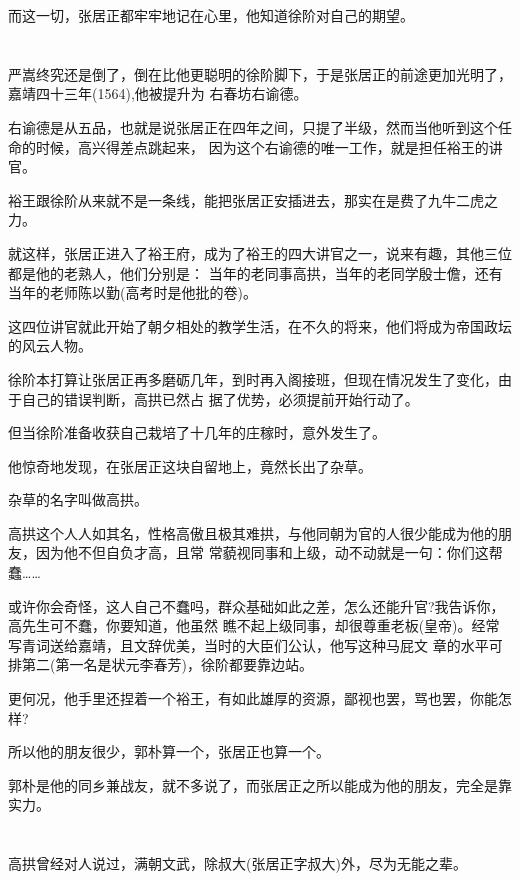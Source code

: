 \documentclass[11pt,a4paper,onecolumn]{article}
\begin{document}
而这一切，张居正都牢牢地记在心里，他知道徐阶对自己的期望。

\section[\thesection]{}

严嵩终究还是倒了，倒在比他更聪明的徐阶脚下，于是张居正的前途更加光明了，嘉靖四十三年(1564),他被提升为
右春坊右谕德。

右谕德是从五品，也就是说张居正在四年之间，只提了半级，然而当他听到这个任命的时候，高兴得差点跳起来，
因为这个右谕德的唯一工作，就是担任裕王的讲官。

裕王跟徐阶从来就不是一条线，能把张居正安插进去，那实在是费了九牛二虎之力。

就这样，张居正进入了裕王府，成为了裕王的四大讲官之一，说来有趣，其他三位都是他的老熟人，他们分别是：
当年的老同事高拱，当年的老同学殷士儋，还有当年的老师陈以勤(高考时是他批的卷)。

这四位讲官就此开始了朝夕相处的教学生活，在不久的将来，他们将成为帝国政坛的风云人物。

徐阶本打算让张居正再多磨砺几年，到时再入阁接班，但现在情况发生了变化，由于自己的错误判断，高拱已然占
据了优势，必须提前开始行动了。

但当徐阶准备收获自己栽培了十几年的庄稼时，意外发生了。

他惊奇地发现，在张居正这块自留地上，竟然长出了杂草。

杂草的名字叫做高拱。

高拱这个人人如其名，性格高傲且极其难拱，与他同朝为官的人很少能成为他的朋友，因为他不但自负才高，且常
常藐视同事和上级，动不动就是一句：你们这帮蠢……

或许你会奇怪，这人自己不蠢吗，群众基础如此之差，怎么还能升官?我告诉你，高先生可不蠢，你要知道，他虽然
瞧不起上级同事，却很尊重老板(皇帝)。经常写青词送给嘉靖，且文辞优美，当时的大臣们公认，他写这种马屁文
章的水平可排第二(第一名是状元李春芳)，徐阶都要靠边站。

更何况，他手里还捏着一个裕王，有如此雄厚的资源，鄙视也罢，骂也罢，你能怎样?

所以他的朋友很少，郭朴算一个，张居正也算一个。

郭朴是他的同乡兼战友，就不多说了，而张居正之所以能成为他的朋友，完全是靠实力。

\section[\thesection]{}

高拱曾经对人说过，满朝文武，除叔大(张居正字叔大)外，尽为无能之辈。
\end{document}
